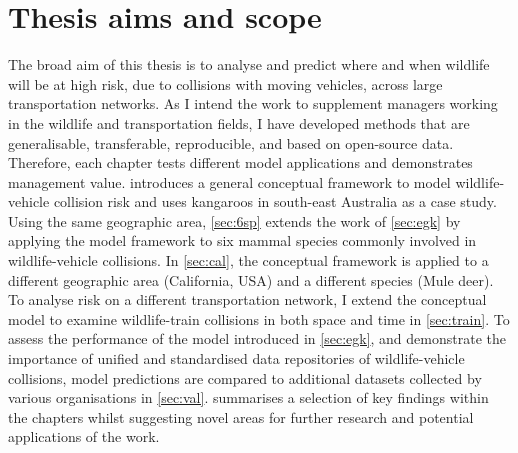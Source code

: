 \section{Thesis aims and scope}

The broad aim of this thesis is to analyse and predict where and when wildlife will be at high risk, due to collisions with moving vehicles, across large transportation networks. As I intend the work to supplement managers working in the wildlife and transportation fields, I have developed methods that are generalisable, transferable, reproducible, and based on open-source data. Therefore, each chapter tests different model applications and demonstrates management value.  introduces a general conceptual framework to model wildlife-vehicle collision risk and uses kangaroos in south-east Australia as a case study. Using the same geographic area, \cref{sec:6sp} extends the work of \cref{sec:egk} by applying the model framework to six mammal species commonly involved in wildlife-vehicle collisions. In \cref{sec:cal}, the conceptual framework is applied to a different geographic area (California, USA) and a different species (Mule deer). To analyse risk on a different transportation network, I extend the conceptual model to examine wildlife-train collisions in both space and time in \cref{sec:train}. To assess the performance of the model introduced in \cref{sec:egk}, and demonstrate the importance of unified and standardised data repositories of wildlife-vehicle collisions, model predictions are compared to additional datasets collected by various organisations in \cref{sec:val}.  summarises a selection of key findings within the chapters whilst suggesting novel areas for further research and potential applications of the work.
